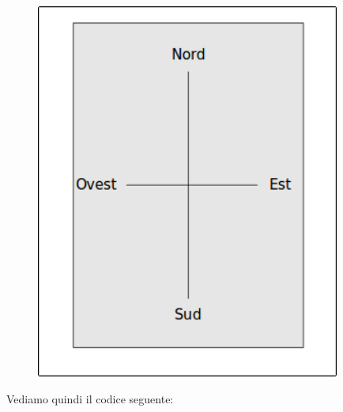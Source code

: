 \begin{figure}[H]
   \centering
   \includegraphics[width=10.0cm,trim=8 8 8 8,clip]{./images/disegnare/disegnare-37.png}
   \label{dis-37}
\end{figure}

\vskip 1cm

Vediamo quindi il codice seguente:

\pagebreak

\vskip 1cm

